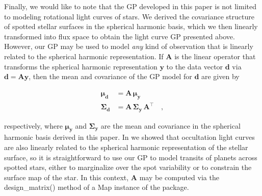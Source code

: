 \documentclass[modern,linenumbers]{aastex62}
\begin{document}
Finally, we would like to note that the GP developed in this paper is not
limited to modeling rotational light curves of stars. We derived the
covariance structure of spotted stellar surfaces in the spherical harmonic
basis, which we then linearly transformed into flux space to obtain the
light curve GP presented above. However, our GP may be used to model
\emph{any} kind of observation that
is linearly related to the spherical harmonic representation. If $\mathbf{A}$
is the linear operator that transforms the spherical harmonic representation
$\mathbf{y}$ to the data vector $\mathbf{d}$ via
$\mathbf{d} = \mathbf{A} \mathbf{y}$, then the mean and covariance of the
GP model for $\mathbf{d}$ are given by
%
\begin{linenomath}\begin{align}
        \pmb{\mu}_\mathbf{d}    & = \mathbf{A} \, \pmb{\mu}_\mathbf{y}
        \\
        \pmb{\Sigma}_\mathbf{d} & = \mathbf{A} \, \pmb{\Sigma}_\mathbf{y} \, \mathbf{A}^\top
        \quad,
    \end{align}\end{linenomath}
%
respectively, where $\pmb{\mu}_\mathbf{y}$ and $\pmb{\Sigma}_\mathbf{y}$
are the mean and covariance in the spherical harmonic basis derived in this paper.
In \citet{Luger2019} we showed that
occultation light curves are also linearly related to the
spherical harmonic representation of the stellar surface, so it is
straightforward to use our GP to model transits of planets across spotted
stars, either to marginalize over the spot variability or to constrain the
surface map of the star. In this context, $\mathbf{A}$ may be computed via the
\textsf{design\_matrix()} method of a \textsf{Map} instance of the \starry
package.
\end{document}
